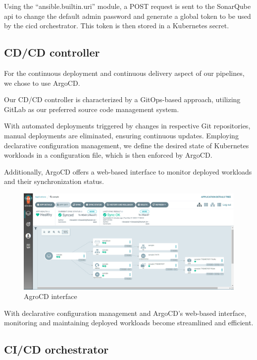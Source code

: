 Using the “ansible.builtin.uri” module, a POST request is sent to the SonarQube api to change the default admin password and generate a global token to be used by the cicd orchestrator. This token is then stored in a Kubernetes secret.

\subsection{CD/CD controller }

For the continuous deployment and continuous delivery aspect of our pipelines, we chose to use ArgoCD. 

Our CD/CD controller is characterized by a GitOps-based approach, utilizing GitLab as our preferred source code management system.

With automated deployments triggered by changes in respective Git repositories, manual deployments are eliminated, ensuring continuous updates. Employing declarative configuration management, we define the desired state of Kubernetes workloads in a configuration file, which is then enforced by ArgoCD. 

Additionally, ArgoCD offers a web-based interface to monitor deployed workloads and their synchronization status. 

\begin{figure}[H]\centering
\includegraphics[width=1.0\textwidth,angle=00]{assets/f43.png}
\caption{ AgroCD interface }
\label{fig:AgroCD interface}
\end{figure}

With declarative configuration management and ArgoCD's web-based interface, monitoring and maintaining deployed workloads become streamlined and efficient.

\newpage

\subsection{CI/CD orchestrator }

